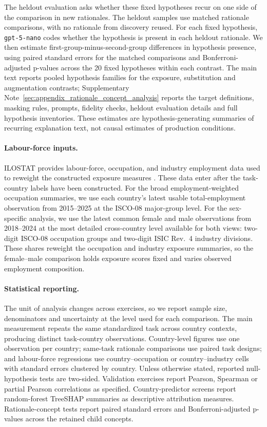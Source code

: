 \documentclass[11pt]{article}
\begin{document}
The heldout evaluation asks whether these fixed hypotheses recur on one side of the comparison in new rationales. The heldout samples use matched rationale comparisons, with no rationale from discovery reused. For each fixed hypothesis, \texttt{gpt-5-nano} codes whether the hypothesis is present in each heldout rationale. We then estimate first-group-minus-second-group differences in hypothesis presence, using paired standard errors for the matched comparisons and Bonferroni-adjusted p-values across the 20 fixed hypotheses within each contrast. The main text reports pooled hypothesis families for the exposure, substitution and augmentation contrasts; Supplementary Note~\ref{sec:appendix_rationale_concept_analysis} reports the target definitions, masking rules, prompts, fidelity checks, heldout evaluation details and full hypothesis inventories. These estimates are hypothesis-generating summaries of recurring explanation text, not causal estimates of production conditions.

\paragraph{Labour-force inputs.} ILOSTAT provides labour-force, occupation, and industry employment data used to reweight the constructed exposure measures \citep{ilostat_database,ILOSTATLabourForceStats2026,ILOSTATProfiles2026}. These data enter after the task-country labels have been constructed. For the broad employment-weighted occupation summaries, we use each country's latest usable total-employment observation from 2015--2025 at the ISCO-08 major-group level. For the sex-specific analysis, we use the latest common female and male observations from 2018--2024 at the most detailed cross-country level available for both views: two-digit ISCO-08 occupation groups and two-digit ISIC Rev.~4 industry divisions. These shares reweight the occupation and industry exposure summaries, so the female--male comparison holds exposure scores fixed and varies observed employment composition.

\paragraph{Statistical reporting.}
The unit of analysis changes across exercises, so we report sample size, denominators and uncertainty at the level used for each comparison. The main measurement repeats the same standardized task across country contexts, producing distinct task-country observations. Country-level figures use one observation per country; same-task rationale comparisons use paired task designs; and labour-force regressions use country--occupation or country--industry cells with standard errors clustered by country. Unless otherwise stated, reported null-hypothesis tests are two-sided. Validation exercises report Pearson, Spearman or partial Pearson correlations as specified. Country-predictor screens report random-forest TreeSHAP summaries as descriptive attribution measures. Rationale-concept tests report paired standard errors and Bonferroni-adjusted p-values across the retained child concepts.
\end{document}
